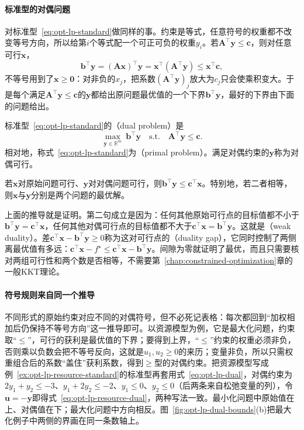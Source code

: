 \paragraph{标准型的对偶问题}
对标准型~\eqref{eq:opt-lp-standard}做同样的事。约束是等式，任意符号的权重都不改变等号方向，所以给第$i$个等式配一个可正可负的权重$y_i$。若$\bm A^\top\bm y\le\bm c$，则对任意可行$\bm x$，
\[
  \bm b^\top\bm y=(\bm A\bm x)^\top\bm y=\bm x^\top(\bm A^\top\bm y)\le\bm x^\top\bm c,
\]
不等号用到了$\bm x\ge\bm 0$：对非负的$x_j$，把系数$(\bm A^\top\bm y)_j$放大为$c_j$只会使乘积变大。于是每个满足$\bm A^\top\bm y\le\bm c$的$\bm y$都给出原问题最优值的一个下界$\bm b^\top\bm y$，最好的下界由下面的问题给出。

\begin{definition}[线性规划的对偶问题]
\label{def:opt-lp-dual}
标准型~\eqref{eq:opt-lp-standard}的（dual problem）是
\begin{equation}
\label{eq:opt-lp-dual}
  \max_{\bm y\in\mathbb R^m}\ \bm b^\top\bm y
  \quad\text{s.t.}\quad
  \bm A^\top\bm y\le\bm c.
\end{equation}
相对地，称式~\eqref{eq:opt-lp-standard}为（primal problem）。满足对偶约束的$\bm y$称为对偶可行。
\end{definition}

\begin{theorem}[弱对偶]
\label{thm:opt-lp-weak-duality}
若$\bm x$对原始问题可行、$\bm y$对对偶问题可行，则$\bm b^\top\bm y\le\bm c^\top\bm x$。特别地，若二者相等，则$\bm x$与$\bm y$分别是两个问题的最优解。
\end{theorem}

上面的推导就是证明。第二句成立是因为：任何其他原始可行点的目标值都不小于$\bm b^\top\bm y=\bm c^\top\bm x$，任何其他对偶可行点的目标值都不大于$\bm c^\top\bm x=\bm b^\top\bm y$。这就是（weak duality）。差$\bm c^\top\bm x-\bm b^\top\bm y\ge0$称为这对可行点的（duality gap），它同时控制了两侧离最优值有多远：$\bm c^\top\bm x-f^\star\le\bm c^\top\bm x-\bm b^\top\bm y$。间隙为零就证明了最优，而且只需要核对两组可行性和两个数是否相等，不需要第~\ref{chap:constrained-optimization}章的一般KKT理论。

\paragraph{符号规则来自同一个推导}
不同形式的原始约束对应不同的对偶符号，但不必死记表格：每次都回到“加权相加后仍保持不等号方向”这一推导即可。以资源模型为例，它是最大化问题，约束取“$\le$”，可行的获利是最优值的下界；要得到上界，“$\le$”约束的权重必须非负，否则乘以负数会把不等号反向，这就是$u_1,u_2\ge0$的来历；变量非负，所以只需权重组合后的系数“盖住”获利系数，得到$\ge$型的对偶约束。把资源模型写成例~\ref{ex:opt-lp-resource-standard}的标准型再套用式~\eqref{eq:opt-lp-dual}，对偶约束为$2y_1+y_2\le-3$、$y_1+2y_2\le-2$、$y_1\le0$、$y_2\le0$（后两条来自松弛变量的列），令$\bm u=-\bm y$即得式~\eqref{eq:opt-lp-resource-dual}，两种写法一致。最小化问题中原始值在上、对偶值在下；最大化问题中方向相反。图~\ref{fig:opt-lp-dual-bounds}(b)把最大化例子中两侧的界画在同一条数轴上。

